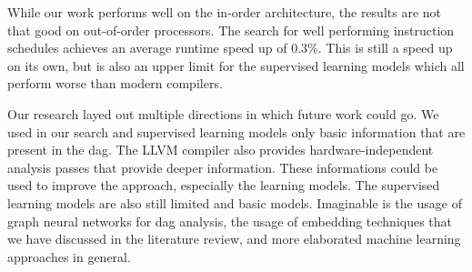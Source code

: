 While our work performs well on the in-order architecture, the results are not that good on out-of-order processors.
The search for well performing instruction schedules achieves an average runtime speed up of 0.3\%.
This is still a speed up on its own, but is also an upper limit for the supervised learning models which all perform worse than modern compilers.
 
Our research layed out multiple directions in which future work could go.
We used in our search and supervised learning models only basic information that are present in the \ac{dag}.
The LLVM compiler also provides hardware-independent analysis passes that provide deeper information.
These informations could be used to improve the approach, especially the learning models.
The supervised learning models are also still limited and basic models.
Imaginable is the usage of graph neural networks for \ac{dag} analysis, the usage of embedding techniques that we have discussed in the literature review, and more elaborated machine learning approaches in general.








